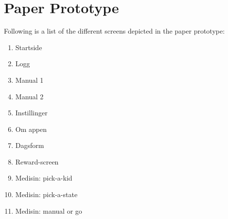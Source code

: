 \chapter{Paper Prototype}
Following is a list of the different screens depicted in the paper prototype:
	\begin{enumerate}
		\item Startside
		\item Logg
		\item Manual 1
		\item Manual 2
		\item Instillinger
		\item Om appen
		\item Dagsform
		\item Reward-screen
		\item Medisin: pick-a-kid
		\item Medisin: pick-a-state
		\item Medisin: manual or go
	\end{enumerate}
